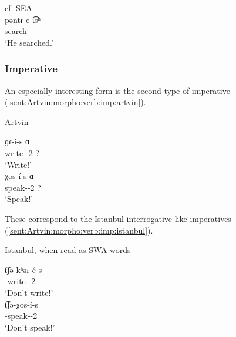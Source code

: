 
\begin{exe}
	\ex cf. SEA \label{sent:Artvin:morpho:verb:theme:search:SEA} \\
	\gll pəntɾ-e-t͡sʰ \\
	search-{\thgloss}-{\aor} \\
	\trans `He searched.' \\
\end{exe}

\subsubsection{Imperative}

An especially interesting form is the second type of imperative (\ref{sent:Artvin:morpho:verb:imp:artvin}).


\begin{exe}
	\ex Artvin \label{sent:Artvin:morpho:verb:imp:artvin}
	\begin{xlist}
		\ex \gll ɡɾ-\'i-s ɑ \\
		write-{\thgloss}-2{\sg} ? \\
		\trans `Write!' \\
		\ex \gll χos-\'i-s ɑ \\
		speak-{\thgloss}-2{\sg} ? \\
		\trans `Speak!' \\
	\end{xlist}
\end{exe}

These correspond to the Istanbul interrogative-like imperatives (\ref{sent:Artvin:morpho:verb:imp:istanbul}). 


\begin{exe}
	\ex Istanbul, when read as SWA words \label{sent:Artvin:morpho:verb:imp:istanbul}
	\begin{xlist}
		\ex \gll t͡ʃə-kʰəɾ-\'e-s \\
		{\neggloss}-write-{\thgloss}-2{\sg}   \\
		\trans `Don't write!' \\
		\armenian{չգրե՞ս}
		\ex \gll t͡ʃə-χos-\'i-s \\
		{\neggloss}-speak-{\thgloss}-2{\sg}   \\
		\trans `Don't speak!' \\
		\armenian{չխօսի՞ս} 
	\end{xlist}
\end{exe}



